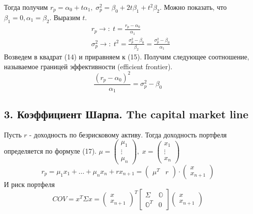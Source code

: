 \documentclass[12pt]{article}
\theoremstyle{definition}
\theoremstyle{remark}
\begin{document}
Тогда получим $r_p=\alpha_0+t\alpha_1,\; \sigma_p^2=\beta_0+2t\beta_1+t^2\beta_2$. Можно показать, что $\beta_1=0, \alpha_1=\beta_2$. Выразим $t$.
\begin{align}
  &r_p\to:\;t=\frac{r_p-\alpha_0}{\alpha_1}\\
  &\sigma_p^2\to:\;t^2=\frac{\sigma_p^2-\beta_0}{\beta_2}=\frac{\sigma_p^2-\beta_0}{\alpha_1}
\end{align}
Возведем в квадрат (14) и приравняем к (15). Получим следующее соотношение, называемое границей эффективности (efficient frontier).
\begin{equation}
  \frac{(r_p-\alpha_0)^2}{\alpha_1}=\sigma_p^2-\beta_0
\end{equation}

\subsection*{3. Коэффициент Шарпа. The capital market line}
Пусть $r$ - доходность по безрисковому активу. Тогда доходность портфеля определяется по формуле (17).
$\mu=\begin{pmatrix} \mu_1\\ \vdots \\ \mu_n \end{pmatrix},\;x=\begin{pmatrix} x_1\\ \vdots \\ x_n \end{pmatrix}$
\begin{equation}
  r_p = \mu_1x_1+...+\mu_nx_n+r x_{n+1}=\begin{pmatrix} \mu^T&r \end{pmatrix}\cdot \begin{pmatrix} x\\ x_{n+1} \end{pmatrix}
\end{equation}
И риск портфеля
\begin{equation}
 COV=x^T\Sigma x=\begin{pmatrix} x\\ x_{n+1} \end{pmatrix}^T \begin{bmatrix} \Sigma&\mathbb{O}\\\mathbb{O}^T&0 \end{bmatrix}
   \begin{pmatrix} x\\ x_{n+1} \end{pmatrix}
\end{equation}
\end{document}
